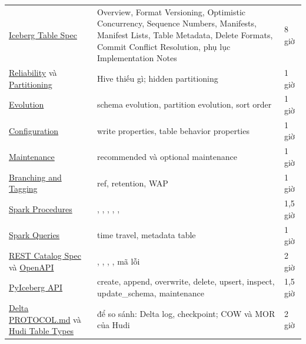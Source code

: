 \begin{xltabular}{\textwidth}{@{}P{4.2cm} L P{1.8cm}@{}}
\toprule
{} &  &  \\
\midrule
\endhead
\bottomrule
\endfoot
\href{https://iceberg.apache.org/spec/}{Iceberg Table Spec} & Overview, Format Versioning, Optimistic Concurrency, Sequence Numbers, Manifests, Manifest Lists, Table Metadata, Delete Formats, Commit Conflict Resolution, phụ lục Implementation Notes & 8 giờ \\
\href{https://iceberg.apache.org/docs/latest/reliability/}{Reliability} và \href{https://iceberg.apache.org/docs/latest/partitioning/}{Partitioning} & Hive thiếu gì; hidden partitioning & 1 giờ \\
\href{https://iceberg.apache.org/docs/latest/evolution/}{Evolution} & schema evolution, partition evolution, sort order & 1 giờ \\
\href{https://iceberg.apache.org/docs/latest/configuration/}{Configuration} & write properties, table behavior properties & 1 giờ \\
\href{https://iceberg.apache.org/docs/latest/maintenance/}{Maintenance} & recommended và optional maintenance & 1 giờ \\
\href{https://iceberg.apache.org/docs/latest/branching/}{Branching and Tagging} & ref, retention, WAP & 1 giờ \\
\href{https://iceberg.apache.org/docs/latest/spark-procedures/}{Spark Procedures} & , , , , ,  & 1,5 giờ \\
\href{https://iceberg.apache.org/docs/latest/spark-queries/}{Spark Queries} & time travel, metadata table & 1 giờ \\
\href{https://iceberg.apache.org/rest-catalog-spec/}{REST Catalog Spec} và \href{https://github.com/apache/iceberg/blob/main/open-api/rest-catalog-open-api.yaml}{OpenAPI} & , , , , mã lỗi & 2 giờ \\
\href{https://py.iceberg.apache.org/api/}{PyIceberg API} & create, append, overwrite, delete, upsert, inspect, update\_schema, maintenance & 1,5 giờ \\
\href{https://github.com/delta-io/delta/blob/master/PROTOCOL.md}{Delta PROTOCOL.md} và \href{https://hudi.apache.org/docs/table_types/}{Hudi Table Types} & để so sánh: Delta log, checkpoint; COW và MOR của Hudi & 2 giờ \\
\end{xltabular}

